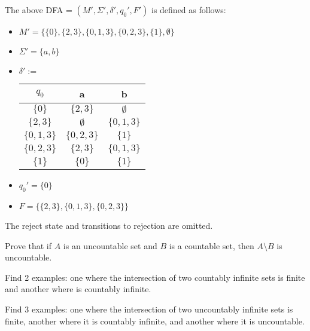 \documentclass[solution, letterpaper]{cs121}
\begin{document}
\noindent\\\\The above DFA = $(M', \Sigma', \delta', q_0', F')$ is defined as follows:
\begin{itemize}
	\setlength{\itemsep}{0pt}
	\item $M' = \{\{0\},\{2,3\},\{0,1,3\},\{0,2,3\},\{1\},\emptyset\}$
	\item $\Sigma' = \{a,b\}$
	\item $\delta' := $ 
	\begin{table}[h!]
		\begin{center}
			\begin{tabular}{ c | c | c }
				$q_0$ & a & b\\
				\hline
				$\{0\}$ & $\{2,3\}$ & $\emptyset$\\
				$\{2,3\}$ & $\emptyset$ & $\{0,1,3\}$\\
				$\{0,1,3\}$ & $\{0,2,3\}$ & $\{1\}$\\
				$\{0,2,3\}$ & $\{2,3\}$ & $\{0,1,3\}$\\
				$\{1\}$ & $\{0\}$ & $\{1\}$\\
			\end{tabular}
		\end{center}
	\end{table}
	\item $q_0' = \{0\}$
	\item $F = \{\{2,3\},\{0,1,3\},\{0,2,3\}\}$
\end{itemize}

\noindent The reject state and transitions to rejection are omitted.

\subproblem
Prove that if $A$ is an uncountable set and $B$ is a countable set, then 
$A \setminus B$ is uncountable.

\vspace{-4pt}
\subproblem
Find 2 examples: one where the intersection of two countably infinite sets
is finite and another where is countably infinite.

\vspace{-4pt}
\subproblem
Find 3 examples: one where the intersection of two uncountably infinite sets
is finite, another where it is countably infinite, and another where it is
uncountable.

\def\gsim{\mathrel{\rlap{\lower4pt\hbox{\hskip1pt$\sim$}}
    \raise1pt\hbox{$>$}}}                %
\def\notgsim{\mathrel{\rlap{\lower4pt\hbox{\hskip1pt$\sim$}}
    \raise1pt\hbox{$\not>$}}}                %
\def\notsim{\mathrel{\rlap{\hbox{$\sim$}}
    \hbox{$\not$}}}
\end{document}
